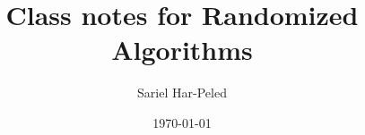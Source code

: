 %


\def\bookMode{TRUE}%

\makeatletter
{}
\makeatother

\renewcommand{\ChapterGen}{}

\renewcommand{\StandAloneMode}[1]{}
\renewcommand{\BookMode}[1]{#1}



\pagestyle{plain}
\frontmatter

\title{Class notes for Randomized Algorithms}

\author{Sariel Har-Peled}

\date{\today}

\maketitle

\tableofcontents
\mainmatter








\renewcommand{\File}[1]{\Dir/#1}
\renewcommand{\RootFile}[1]{#1}

